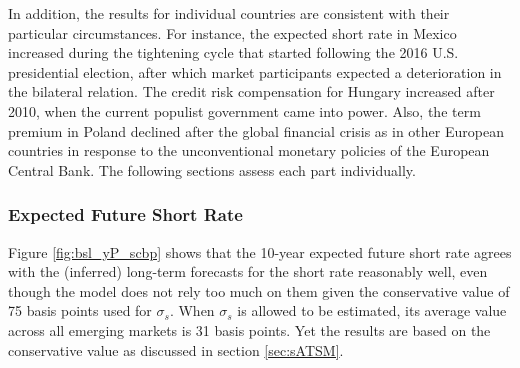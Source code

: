 {In addition, the results for individual countries are consistent with their particular circumstances.
For instance, the expected short rate in Mexico increased during the tightening cycle that started %
following the 2016 U.S. presidential election, after which market participants expected a deterioration in the bilateral relation.
The credit risk compensation for Hungary increased after 2010, when the current populist government came into power. 
Also, %
the term premium in Poland declined after the global financial crisis as in other European countries in response to the unconventional monetary policies of the European Central Bank.
The following sections assess each part individually.

\subsubsection{Expected Future Short Rate}
\iftoggle{toclinks}{\gototoc}{} %

Figure \ref{fig:bsl_yP_scbp} shows that the 10-year expected future short rate agrees with the (inferred) long-term forecasts for the short rate reasonably well, even though the model does not rely too much on them given the conservative value of 75 basis points used for \(\sigma_s\).
When \(\sigma_s\) is allowed to be estimated, its average value across all emerging markets is 31 basis points. Yet the results are based on the conservative value as discussed in section \ref{sec:sATSM}. %





}

